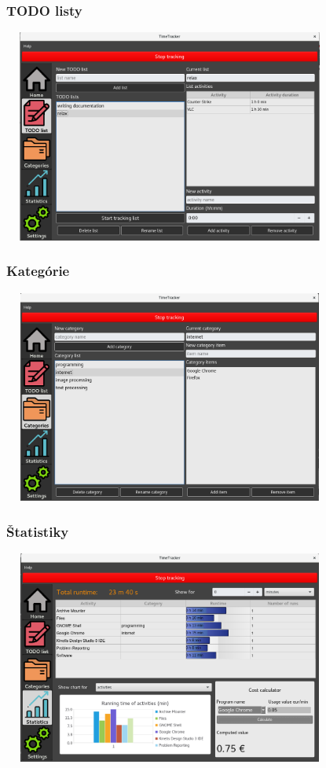 \documentclass[10pt,xcolor=pdflatex]{beamer}
\begin{document}
\begin{frame}
\frametitle{TODO listy}
\includegraphics[width=11cm, height=7cm]{todo_list}
\end{frame}

\begin{frame}
\frametitle{Kategórie}
\includegraphics[width=11cm, height=7cm]{categories}
\end{frame}

\begin{frame}
\frametitle{Štatistiky}
\includegraphics[width=11cm, height=7cm]{statistics}
\end{frame}
\end{document}
